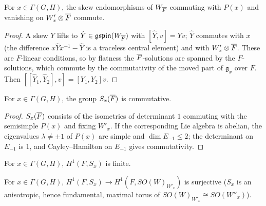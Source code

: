\begin{lemma}
\label{lieAbelian_specP_baseChange}
\leanok
{}
For $x\in\Gamma(G,H)$, the skew endomorphisms of $W_{\overline{F}}$ commuting with $P(x)$ and vanishing on $W'_x\otimes\overline{F}$ commute.
\end{lemma}
\begin{proof}
\leanok
{}
A skew $Y$ lifts to $\hat Y\in\mathfrak{gspin}(W_{\overline{F}})$ with $[\hat Y,v]=Y v$; $\hat Y$ commutes with $x$ (the difference $x\hat Yx^{-1}-\hat Y$ is a traceless central element) and with $W'_x\otimes\overline{F}$. These are $F$-linear conditions, so by flatness the $\overline{F}$-solutions are spanned by the $F$-solutions, which commute by the commutativity of the moved part of $\mathfrak g_x$ over $F$. Then $[[\hat Y_1,\hat Y_2],v]=[Y_1,Y_2]v$.
\end{proof}

\begin{lemma}[$S_x$ is commutative]
\label{torusBarFbar_commute}
\leanok
{}
For $x\in\Gamma(G,H)$, the group $S_x(\overline{F})$ is commutative.
\end{lemma}
\begin{proof}
\leanok
{}
$S_x(\overline{F})$ consists of the isometries of determinant $1$ commuting with the semisimple $P(x)$ and fixing $W'_x$. If the corresponding Lie algebra is abelian, the eigenvalues $\lambda\ne\pm1$ of $P(x)$ are simple and $\dim E_{-1}\le2$; the determinant on $E_{-1}$ is $1$, and Cayley--Hamilton on $E_{-1}$ gives commutativity.
\end{proof}

\begin{literature}[Finiteness of $H^1(F,S_x)$]
\label{LIT-finite_H1_torusBar}
\leanok
{}
For $x\in\Gamma(G,H)$, $H^1(F,S_x)$ is finite.

\end{literature}

\begin{literature}
\label{LIT-exists_rel_torusBar_of_fixerBar}
\leanok
{}
For $x\in\Gamma(G,H)$, $H^1(F,S_x)\to H^1(F,SO(W)_{W'_x})$ is surjective ($S_x$ is an anisotropic, hence fundamental,
maximal torus of $SO(W)_{W'_x}\cong SO(W''_x)$).

\end{literature}

